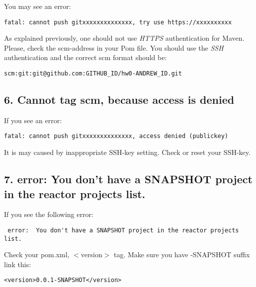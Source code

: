 You may see an error:
\begin{verbatim}
fatal: cannot push gitxxxxxxxxxxxxxx, try use https://xxxxxxxxxx
\end{verbatim}

As explained previously, one should not use \emph{HTTPS} authentication 
for Maven. Please, check the scm-address in your Pom file.
You should use the \emph{SSH} authentication and the correct scm format 
should be:
\begin{verbatim}
scm:git:git@github.com:GITHUB_ID/hw0-ANDREW_ID.git
\end{verbatim}

\subsection{6. Cannot tag scm, because access is denied}

If you see an error:
\begin{verbatim}
fatal: cannot push gitxxxxxxxxxxxxxx, access denied (publickey)
\end{verbatim}
It is may caused by inappropriate SSH-key setting. Check or reset your SSH-key.

\subsection{7. 
 error:  You don't have a SNAPSHOT project in the reactor projects list.}
If you see the following error:
\begin{verbatim}
 error:  You don't have a SNAPSHOT project in the reactor projects list.
\end{verbatim}
Check your pom.xml, $<$version$>$ tag. Make sure you have -SNAPSHOT suffix link this: 
\begin{verbatim}
<version>0.0.1-SNAPSHOT</version>
\end{verbatim}
